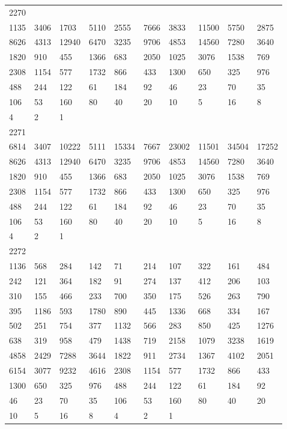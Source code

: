 \begin{longtable}{*{10}{l}}
2270&&&&&&&&&\\
1135& 3406& 1703& 5110& 2555& 7666& 3833& 11500& 5750& 2875\\
8626& 4313& 12940& 6470& 3235& 9706& 4853& 14560& 7280& 3640\\
1820& 910& 455& 1366& 683& 2050& 1025& 3076& 1538& 769\\
2308& 1154& 577& 1732& 866& 433& 1300& 650& 325& 976\\
488& 244& 122& 61& 184& 92& 46& 23& 70& 35\\
106& 53& 160& 80& 40& 20& 10& 5& 16& 8\\
4& 2& 1& \\

2271&&&&&&&&&\\
6814& 3407& 10222& 5111& 15334& 7667& 23002& 11501& 34504& 17252\\
8626& 4313& 12940& 6470& 3235& 9706& 4853& 14560& 7280& 3640\\
1820& 910& 455& 1366& 683& 2050& 1025& 3076& 1538& 769\\
2308& 1154& 577& 1732& 866& 433& 1300& 650& 325& 976\\
488& 244& 122& 61& 184& 92& 46& 23& 70& 35\\
106& 53& 160& 80& 40& 20& 10& 5& 16& 8\\
4& 2& 1& \\

2272&&&&&&&&&\\
1136& 568& 284& 142& 71& 214& 107& 322& 161& 484\\
242& 121& 364& 182& 91& 274& 137& 412& 206& 103\\
310& 155& 466& 233& 700& 350& 175& 526& 263& 790\\
395& 1186& 593& 1780& 890& 445& 1336& 668& 334& 167\\
502& 251& 754& 377& 1132& 566& 283& 850& 425& 1276\\
638& 319& 958& 479& 1438& 719& 2158& 1079& 3238& 1619\\
4858& 2429& 7288& 3644& 1822& 911& 2734& 1367& 4102& 2051\\
6154& 3077& 9232& 4616& 2308& 1154& 577& 1732& 866& 433\\
1300& 650& 325& 976& 488& 244& 122& 61& 184& 92\\
46& 23& 70& 35& 106& 53& 160& 80& 40& 20\\
10& 5& 16& 8& 4& 2& 1& \\


\end{longtable}
